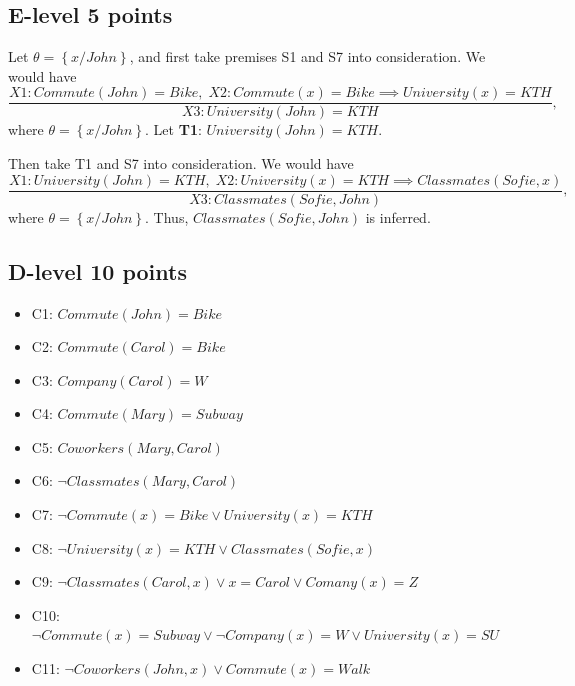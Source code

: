 \documentclass[11pt,a4paper]{article}
\begin{document}
\subsection{E-level 5 points}
\par Let $\theta = \left\{ x / John \right\}$, and first take premises S1 and S7 into consideration. We would have
$$
\frac{X1: Commute(John) = Bike, \; X2: Commute(x) = Bike \implies University(x) = KTH}{X3: University(John) = KTH},
$$
where $\theta = \left\{ x / John \right\}$. Let \textbf{T1}: $University(John) = KTH$.

\par Then take T1 and S7 into consideration. We would have
$$
\frac{X1: University(John) = KTH, \; X2: University(x) = KTH \implies Classmates(Sofie, x)}{X3: Classmates(Sofie, John)},
$$
where $\theta = \left\{ x / John \right\}$.  Thus, $Classmates(Sofie, John)$ is inferred.

\subsection{D-level 10 points}
\begin{itemize}
	\item C1: $Commute(John) = Bike$
	\item C2: $Commute(Carol) = Bike$
	\item C3: $Company(Carol) = W$
	\item C4: $Commute(Mary) = Subway$
	\item C5: $Coworkers(Mary, Carol)$
	\item C6: $\lnot Classmates(Mary, Carol)$
	\item C7: $\lnot Commute(x) = Bike \vee University(x) = KTH$
	\item C8: $\lnot University(x) = KTH \vee Classmates(Sofie, x)$
	\item C9: $\lnot Classmates(Carol, x) \vee x = Carol \vee Comany(x) = Z$
	\item C10: $\lnot Commute(x) = Subway \vee \lnot Company(x) = W \vee University(x) = SU$
	\item C11: $\lnot Coworkers(John, x) \vee Commute(x) = Walk$
\end{itemize}
\end{document}
